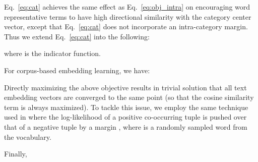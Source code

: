 \documentclass[sigconf]{acmart}
\theoremstyle{definition}
\begin{document}
Eq.~\eqref{eq:cat} achieves the same effect as Eq.~\eqref{eq:obj_intra} on encouraging word representative terms to have high directional similarity with the category center vector, except that Eq.~\eqref{eq:cat} does not incorporate an intra-category margin. Thus we extend Eq.~\eqref{eq:cat} into the following:

where  is the indicator function.

For corpus-based embedding learning, we have:


Directly maximizing the above objective results in trivial solution that all text embedding vectors are converged to the same point (so that the cosine similarity term is always maximized). To tackle this issue, we employ the same technique used in \cite{meng2019spherical} where the log-likelihood of a positive co-occurring tuple  is pushed over that of a negative tuple  by a margin , where  is a randomly sampled word from the vocabulary. 

Finally, 



 
\end{document}
